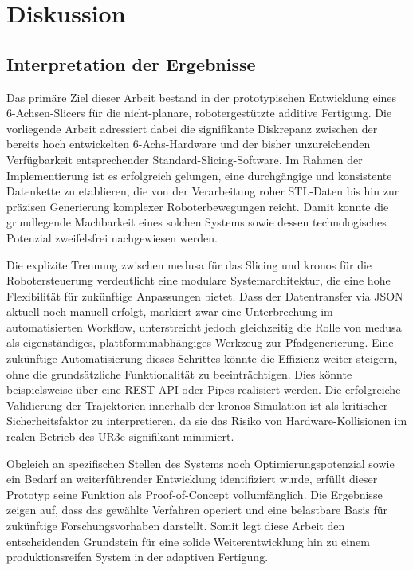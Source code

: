 \chapter{Diskussion}\label{chap:discussion}

  \section{Interpretation der Ergebnisse}\label{sec:interpretation-of-results}
    Das primäre Ziel dieser Arbeit bestand in der prototypischen Entwicklung eines 6-Achsen-Slicers für die nicht-planare, robotergestützte additive Fertigung.
    Die vorliegende Arbeit adressiert dabei die signifikante Diskrepanz zwischen der bereits hoch entwickelten 6-Achs-Hardware und der bisher unzureichenden Verfügbarkeit entsprechender Standard-Slicing-Software.
    Im Rahmen der Implementierung ist es erfolgreich gelungen, eine durchgängige und konsistente Datenkette zu etablieren, die von der Verarbeitung roher \ac{STL}-Daten bis hin zur präzisen Generierung komplexer Roboterbewegungen reicht.
    Damit konnte die grundlegende Machbarkeit eines solchen Systems sowie dessen technologisches Potenzial zweifelsfrei nachgewiesen werden.

    Die explizite Trennung zwischen \ac{medusa} für das Slicing und \ac{kronos} für die Robotersteuerung verdeutlicht eine modulare Systemarchitektur, die eine hohe Flexibilität für zukünftige Anpassungen bietet.
    Dass der Datentransfer via \ac{JSON} aktuell noch manuell erfolgt, markiert zwar eine Unterbrechung im automatisierten Workflow, unterstreicht jedoch gleichzeitig die Rolle von \ac{medusa} als eigenständiges, plattformunabhängiges Werkzeug zur Pfadgenerierung.
    Eine zukünftige Automatisierung dieses Schrittes könnte die Effizienz weiter steigern, ohne die grundsätzliche Funktionalität zu beeinträchtigen.
    Dies könnte beispielsweise über eine \ac{REST}-\ac{API} oder Pipes realisiert werden.
    Die erfolgreiche Validierung der Trajektorien innerhalb der \ac{kronos}-Simulation ist als kritischer Sicherheitsfaktor zu interpretieren, da sie das Risiko von Hardware-Kollisionen im realen Betrieb des UR3e signifikant minimiert.

    Obgleich an spezifischen Stellen des Systems noch Optimierungspotenzial sowie ein Bedarf an weiterführender Entwicklung identifiziert wurde, erfüllt dieser Prototyp seine Funktion als Proof-of-Concept vollumfänglich.
    Die Ergebnisse zeigen auf, dass das gewählte Verfahren operiert und eine belastbare Basis für zukünftige Forschungsvorhaben darstellt.
    Somit legt diese Arbeit den entscheidenden Grundstein für eine solide Weiterentwicklung hin zu einem produktionsreifen System in der adaptiven Fertigung.

